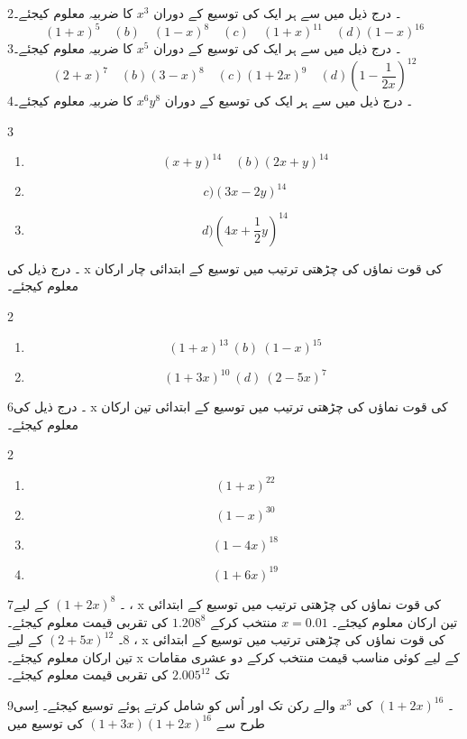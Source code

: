 2۔ درج ذیل میں سے ہر ایک کی توسیع کے دوران 
\(x^{3}\)
کا ضربیہ معلوم کیجئے۔
\[ {(1+x)}^{5}\quad (b)\quad {(1-x)}^{8}\quad (c)\quad {(1+x)}^{11}\quad (d) {(1-x)}^{16}\]
3۔ درج ذیل میں سے ہر ایک کی توسیع کے دوران
\(x^{5}\)
کا ضربیہ معلوم کیجئے۔
\[ {(2+x)}^{7}\quad (b) {(3-x)}^{8}\quad (c) {(1+2x)}^{9}\quad (d) ({1-\frac{1}{2x}})^{12}\]
4۔ درج ذیل میں سے ہر ایک کی توسیع کے دوران
\( {x}^{6}{y}^{8}\)
کا ضربیہ معلوم کیجئے۔
\begin{multicols}{3}
\begin{enumerate}
\item
\[ {(x+y)}^{14}\quad (b) {(2x+y)}^{14}\] 
\item
\[ c){(3x-2y)}^{14}\]
\item
\[ d)(4x+\frac{1}{2}{y})^{14}\]
\end{enumerate}
\end{multicols}

۔  درج ذیل کی x  کی قوت نماؤں کی چڑھتی ترتیب میں توسیع کے ابتدائی چار  ارکان معلوم کیجئے۔ 
\begin{multicols}{2}
\begin{enumerate}
\item
\[ {(1+x)}^{13}\ (b)\ {(1-x)}^{15}\]
\item
\[ {(1+3x)}^{10}\ (d)\ {(2-5x)}^{7}\] 
\end{enumerate}
\end{multicols}
6۔   درج ذیل کی x  کی قوت نماؤں کی چڑھتی ترتیب میں توسیع کے ابتدائی تین  ارکان معلوم کیجئے۔ 
\begin{multicols}{2}
\begin{enumerate}
\item
\[ {(1+x)}^{22}\]
\item
 \[ {(1-x)}^{30}\]
 \item
 \[ {(1-4x)}^{18}\]
 \item
 \[ {(1+6x)}^{19}\]
 \end{enumerate}
\end{multicols}
7۔  
\( {(1+2x)^{8}}\)
کے لیے ،   x  کی قوت نماؤں کی چڑھتی ترتیب میں توسیع کے ابتدائی تین  ارکان معلوم کیجئے۔ 
 \({x}={0.01}\)
منتخب کرکے
 \( {1.208}^{8}\)
کی تقربی  قیمت معلوم کیجئے۔ 
8۔  
\( {(2+5x)^{12}}\)
کے لیے ،   x  کی قوت نماؤں کی چڑھتی ترتیب میں توسیع کے ابتدائی تین  ارکان معلوم کیجئے۔ 
x 
 کے لیے کوئی مناسب قیمت منتخب کرکے دو عشری مقامات تک   
 \( {2.005}^{12}\)
کی تقربی  قیمت معلوم کیجئے۔ 

9۔
 \({(1+2x)^{16}}\)
کی
 \( {x}^{3}\)
والے رکن تک اور اُس کو شامل کرتے ہوئے  توسیع کیجئے۔  اِسی طرح سے 
 \( {(1+3x)}{(1+2x)^{16}}\)
کی توسیع میں  

